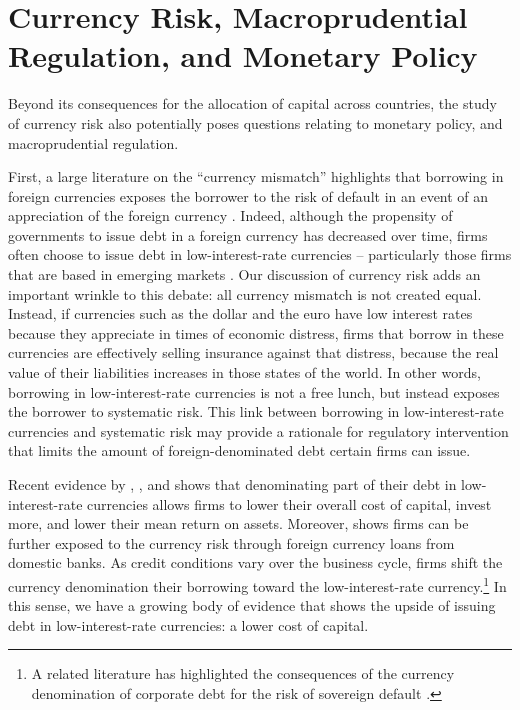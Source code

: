 \documentclass{ar-1col}
\begin{document}
\section{Currency Risk, Macroprudential Regulation, and Monetary Policy \label{sec_balancesheets}}

Beyond its consequences for the allocation of capital across countries, the study of currency risk also potentially poses questions relating to monetary policy, and macroprudential regulation.

First, a large literature on the ``currency mismatch'' highlights that borrowing in foreign currencies exposes the borrower to the risk of default in an event of an appreciation of the foreign currency \citep[e.g]{EichengreenHausmann1999,cespedes2004balance}. Indeed, although the propensity of governments to issue debt in a foreign currency has decreased over time, firms often choose to issue debt in low-interest-rate currencies -- particularly those firms that are based in emerging markets \citep{DuSchreger2016}. Our discussion of currency risk adds an important wrinkle to this debate: all currency mismatch is not created equal. Instead, if currencies such as the dollar and the euro have low interest rates because they appreciate in times of economic distress, firms that borrow in these currencies are effectively selling insurance against that distress, because the real value of their liabilities increases in those states of the world. In other words, borrowing in low-interest-rate currencies is not a free lunch, but instead exposes the borrower to systematic risk. This link between borrowing in low-interest-rate currencies and systematic risk may provide a rationale for regulatory intervention that limits the amount of foreign-denominated debt certain firms can issue.

Recent evidence by \citet{liao2020}, \citet{Richers2020}, and \citet{SalomaoVarela2019} shows that denominating part of their debt in low-interest-rate currencies allows firms to lower their overall cost of capital, invest more, and lower their mean return on assets. Moreover, \citep{KalemliOzcanetal2019} shows firms can be further exposed to the currency risk through foreign currency loans from domestic banks. As credit conditions vary over the business cycle, firms shift the currency denomination their borrowing toward the low-interest-rate currency.\footnote{A related literature has highlighted the consequences of the currency denomination of corporate debt for the risk of sovereign default \citep{DuSchreger2016, OttonelloPerez2019}.} In this sense, we have a growing body of evidence that shows the upside of issuing debt in low-interest-rate currencies: a lower cost of capital. 
\end{document}
